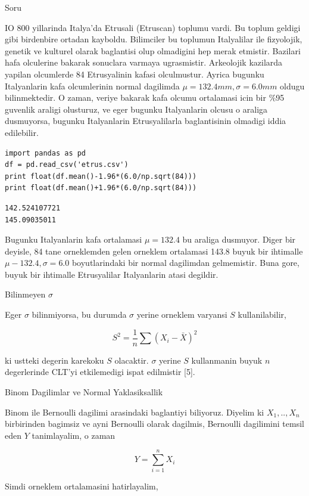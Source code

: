 \documentclass[12pt,fleqn]{article}\usepackage{../common}
\begin{document}
Soru

IO 800 yillarinda Italya'da Etrusali (Etruscan) toplumu vardi. Bu toplum
geldigi gibi birdenbire ortadan kayboldu. Bilimciler bu toplumun
Italyalilar ile fizyolojik, genetik ve kulturel olarak baglantisi olup
olmadigini hep merak etmistir. Bazilari hafa olculerine bakarak sonuclara
varmaya ugrasmistir. Arkeolojik kazilarda yapilan olcumlerde 84
Etrusyalinin kafasi olculmustur. Ayrica bugunku Italyanlarin kafa
olcumlerinin normal dagilimda $\mu=132.4 mm,\sigma=6.0mm$ oldugu
bilinmektedir. O zaman, veriye bakarak kafa olcumu ortalamasi icin bir
\%95 guvenlik araligi olusturuz, ve eger bugunku Italyanlarin olcusu o
araliga dusmuyorsa, bugunku Italyanlarin Etrusyalilarla baglantisinin
olmadigi iddia edilebilir. 

\begin{verbatim}
import pandas as pd
df = pd.read_csv('etrus.csv')
print float(df.mean()-1.96*(6.0/np.sqrt(84)))
print float(df.mean()+1.96*(6.0/np.sqrt(84)))
\end{verbatim}

\begin{verbatim}
142.524107721
145.09035011
\end{verbatim}

Bugunku Italyanlarin kafa ortalamasi $\mu=132.4$ bu araliga dusmuyor. Diger
bir deyisle, 84 tane orneklemden gelen orneklem ortalamasi 143.8 buyuk bir
ihtimalle $\mu-132.4,\sigma=6.0$ boyutlarindaki bir normal dagilimdan
gelmemistir. Buna gore, buyuk bir ihtimalle Etrusyalilar Italyanlarin atasi
degildir. 

Bilinmeyen $\sigma$

Eger $\sigma$ bilinmiyorsa, bu durumda $\sigma$ yerine orneklem varyansi
$S$ kullanilabilir, 

$$ S^2 = \frac{1}{n} \sum (X_i - \bar{X})^2
$$

ki ustteki degerin karekoku $S$ olacaktir. $\sigma$ yerine $S$ kullanmanin 
buyuk $n$ degerlerinde CLT'yi etkilemedigi ispat edilmistir [5]. 


Binom Dagilimlar ve Normal Yaklasiksallik

Binom ile Bernoulli dagilimi arasindaki baglantiyi biliyoruz. Diyelim ki
$X_1,..,X_n$ birbirinden bagimsiz ve ayni Bernoulli olarak dagilmis,
Bernoulli dagilimini temsil eden $Y$ tanimlayalim, o zaman

$$ Y = \sum_{i=1}^n X_i $$

Simdi orneklem ortalamasini hatirlayalim,
\end{document}
